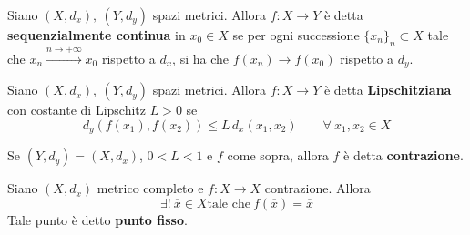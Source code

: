 \begin{definition} \label{Def: Funzione sequenzialmente continua}
    Siano $(X, d_x),\ (Y, d_y)$ spazi metrici. Allora $f: X \to Y$ è detta \textbf{sequenzialmente continua} in $x_0 \in X$ se per ogni successione $\{x_n\}_n \subset X$ tale che $x_n \overset{n\to +\infty}{\to} x_0$ rispetto a $d_x$, si ha che $f(x_n) \to f(x_0)$ rispetto a $d_y$.
\end{definition}
\begin{definition} \label{Def: Lipschitziana}
     Siano $(X, d_x),\ (Y, d_y)$ spazi metrici. Allora $f: X \to Y$ è detta \textbf{Lipschitziana} con costante di Lipschitz $L>0$ se 
     \begin{equation}
         d_y(f(x_1), f(x_2)) \leq L\,d_x(x_1, x_2) \qquad \forall\ x_1, x_2\in X
     \end{equation}
    \end{definition}
\begin{definition} \label{Def: Contrazione}
     Se $(Y, d_y)=(X, d_x)$, $0<L<1$ e $f$ come sopra, allora $f$ è detta \textbf{contrazione}.
\end{definition}
\begin{theorem} \label{Teo: delle contrazioni}
    Siano $(X, d_x)$ metrico completo e $f: X \to X$ contrazione. Allora 
    \begin{equation}
    \exists!\ \overline{x} \in X \text{tale che}\ f(\overline{x})=\overline{x} 
    \end{equation}
    Tale punto è detto \textbf{punto fisso}.
\end{theorem}
